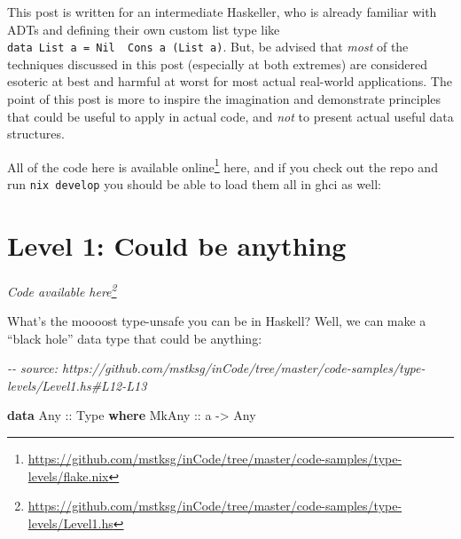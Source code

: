 \documentclass[]{article}
\newenvironment{Shaded}{}{}
\newcommand{\CommentTok}[1]{\textcolor[rgb]{0.38,0.63,0.69}{\textit{#1}}}
\newcommand{\DataTypeTok}[1]{\textcolor[rgb]{0.56,0.13,0.00}{#1}}
\newcommand{\ExtensionTok}[1]{#1}
\newcommand{\KeywordTok}[1]{\textcolor[rgb]{0.00,0.44,0.13}{\textbf{#1}}}
\newcommand{\NormalTok}[1]{#1}
\newcommand{\OperatorTok}[1]{\textcolor[rgb]{0.40,0.40,0.40}{#1}}
\newcommand{\OtherTok}[1]{\textcolor[rgb]{0.00,0.44,0.13}{#1}}
\renewcommand{\href}[2]{#2\footnote{\url{#1}}}
\begin{document}
This post is written for an intermediate Haskeller, who is already familiar with
ADTs and defining their own custom list type like
\texttt{data\ List\ a\ =\ Nil\ \textbar{}\ Cons\ a\ (List\ a)}. But, be advised
that \emph{most} of the techniques discussed in this post (especially at both
extremes) are considered esoteric at best and harmful at worst for most actual
real-world applications. The point of this post is more to inspire the
imagination and demonstrate principles that could be useful to apply in actual
code, and \emph{not} to present actual useful data structures.

All of the code here is
\href{https://github.com/mstksg/inCode/tree/master/code-samples/type-levels/flake.nix}{available
online} here, and if you check out the repo and run \texttt{nix\ develop} you
should be able to load them all in ghci as well:

\begin{Shaded}
\end{Shaded}

\section{Level 1: Could be anything}\label{level-1-could-be-anything}

\emph{\href{https://github.com/mstksg/inCode/tree/master/code-samples/type-levels/Level1.hs}{Code
available here}}

What's the moooost type-unsafe you can be in Haskell? Well, we can make a
``black hole'' data type that could be anything:

\begin{Shaded}
\begin{Highlighting}[]
\CommentTok{{-}{-} source: https://github.com/mstksg/inCode/tree/master/code{-}samples/type{-}levels/Level1.hs\#L12{-}L13}

\KeywordTok{data} \DataTypeTok{Any}\OtherTok{ ::} \DataTypeTok{Type} \KeywordTok{where}
  \DataTypeTok{MkAny}\OtherTok{ ::}\NormalTok{ a }\OtherTok{{-}\textgreater{}} \DataTypeTok{Any}
\end{Highlighting}
\end{Shaded}
\end{document}
